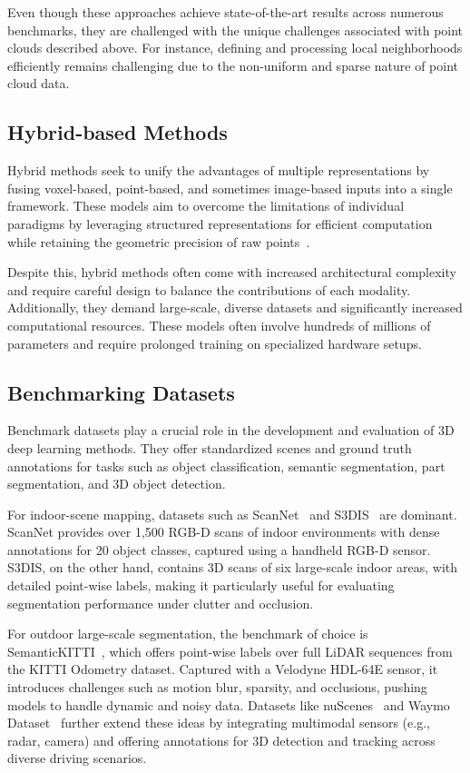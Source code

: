 Even though these approaches achieve state-of-the-art results across numerous
benchmarks, they are challenged with the unique challenges associated with
point clouds described above.
%
For instance, defining and processing local neighborhoods efficiently remains
challenging due to the non-uniform and sparse nature of point cloud data.

\subsection{Hybrid-based Methods}
Hybrid methods seek to unify the advantages of multiple representations by
fusing voxel-based, point-based, and sometimes image-based inputs into a single
framework. These models aim to overcome the limitations of individual paradigms
by leveraging structured representations for efficient computation while
retaining the geometric precision of raw
points~\cite{liu2019point,yan20222dpass,cheng20212,liu2023uniseg}.

Despite this, hybrid methods often come with increased architectural complexity
and require careful design to balance the contributions of each modality.
Additionally, they demand large-scale, diverse datasets and significantly
increased computational resources. These models often involve hundreds of
millions of parameters and require prolonged training on specialized hardware
setups.

\subsection{Benchmarking Datasets}

Benchmark datasets play a crucial role in the development and evaluation of 3D
deep learning methods. They offer standardized scenes and ground truth
annotations for tasks such as object classification, semantic segmentation,
part segmentation, and 3D object detection.
%

For indoor-scene mapping, datasets such as ScanNet~\cite{dai2017scannet} and
S3DIS~\cite{armeni20163d} are dominant. ScanNet provides over 1,500 RGB-D scans
of indoor environments with dense annotations for 20 object classes, captured
using a handheld RGB-D sensor. S3DIS, on the other hand, contains 3D scans of
six large-scale indoor areas, with detailed point-wise labels, making it
particularly useful for evaluating segmentation performance under clutter and
occlusion.

For outdoor large-scale segmentation, the benchmark of choice is
SemanticKITTI~\cite{behley2019semantickitti}, which offers point-wise labels
over full LiDAR sequences from the KITTI Odometry dataset. Captured with a
Velodyne HDL-64E sensor, it introduces challenges such as motion blur,
sparsity, and occlusions, pushing models to handle dynamic and noisy data.
Datasets like nuScenes~\cite{caesar2020nuscenes} and Waymo
Dataset~\cite{sun2020scalability} further extend these ideas by integrating
multimodal sensors (e.g., radar, camera) and offering annotations for 3D
detection and tracking across diverse driving scenarios.

